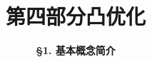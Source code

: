 



\title[Convex Optimization]{\LARGE \bfseries 第四部分\quad 凸优化} %
\author[Basic Concepts] %
{\Large \bfseries \S 1. 基本概念简介}
\date{}






\begin{frame}

\titlepage %

\end{frame}





